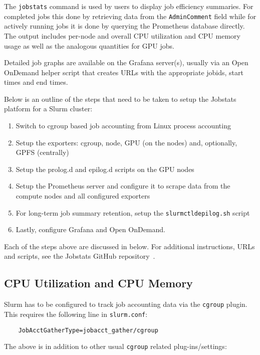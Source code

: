 The \texttt{jobstats} command is used by users to display job efficiency summaries. For completed jobs this done by retrieving data from the \texttt{AdminComment} field while for actively running jobs it is done by querying the Prometheus database directly. The output includes per-node and overall CPU utilization and CPU memory usage as well as the analogous quantities for GPU jobs.

Detailed job graphs are available on the Grafana server(s), usually via an Open OnDemand helper script that creates URLs with the appropriate jobids, start times and end times.

Below is an outline of the steps that need to be taken to setup the Jobstats platform for a Slurm cluster:

\begin{enumerate}
\item Switch to cgroup based job accounting from Linux process accounting
\item Setup the exporters: cgroup, node, GPU (on the nodes) and, optionally, GPFS (centrally)
\item Setup the prolog.d and epilog.d scripts on the GPU nodes
\item Setup the Prometheus server and configure it to scrape data from the compute nodes and all configured exporters
\item For long-term job summary retention, setup the \texttt{slurmctldepilog.sh} script
\item Lastly, configure Grafana and Open OnDemand.
\end{enumerate}

\noindent
Each of the steps above are discussed in below. For additional instructions, URLs and scripts, see the Jobstats GitHub repository~\cite{jobstats_repo}.

\subsection{CPU Utilization and CPU Memory}
\label{cgroup_sec}

Slurm has to be configured to track job accounting data via the \texttt{cgroup} plugin. This requires the following line in \texttt{slurm.conf}:

\begin{verbatim}
    JobAcctGatherType=jobacct_gather/cgroup
\end{verbatim}

\noindent
The above is in addition to other usual \texttt{cgroup} related plug-ins/settings:

